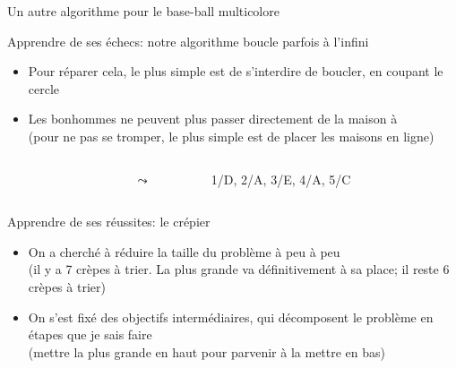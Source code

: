 \documentclass[final,hyperref={pdfpagelabels=false}]{beamer}
\renewcommand*{\Large}{\fontsize{\resultLargeX}{\resultLargeY}\selectfont}
\begin{document}
\begin{frame}{Un autre algorithme pour le base-ball multicolore}
  \begin{block}{Apprendre de ses échecs: {\color{black}notre algorithme boucle parfois à l'infini}}
    \begin{itemize}
    \item Pour réparer cela, le plus simple est de s'interdire de boucler, en
      coupant le cercle
    \item Les bonhommes ne peuvent plus passer directement de la maison
       à \\
      (pour ne pas se tromper, le plus simple est de placer les maisons en ligne)
    \end{itemize}

    \begin{columns}
      \begin{column}{.2\linewidth}
        ~
      \end{column}
      \begin{column}{.2\linewidth}\center
      \end{column}

      \begin{column}{.1\linewidth}\center
        \Large$\leadsto$
      \end{column}

      \begin{column}{.2\linewidth}\center
                    {1/D, 2/A, 3/E, 4/A, 5/C}
      \end{column}
      \begin{column}{.2\linewidth}
        ~
      \end{column}
    \end{columns}
  \end{block}

  \bigskip

  \begin{block}{Apprendre de ses réussites: {\color{black}le crépier}}
    \begin{itemize}
    \item On a cherché à réduire la taille du problème à peu à peu\\
      {(il y a 7 crèpes à trier. La plus grande va définitivement à sa place; il
        reste 6 crèpes à trier)}
    \item On s'est fixé des objectifs intermédiaires, qui décomposent le
      problème en étapes que je sais faire\\
      {(mettre la plus grande en haut pour parvenir à la mettre en bas)}
    \end{itemize}
  \end{block}


\end{frame}
\end{document}
